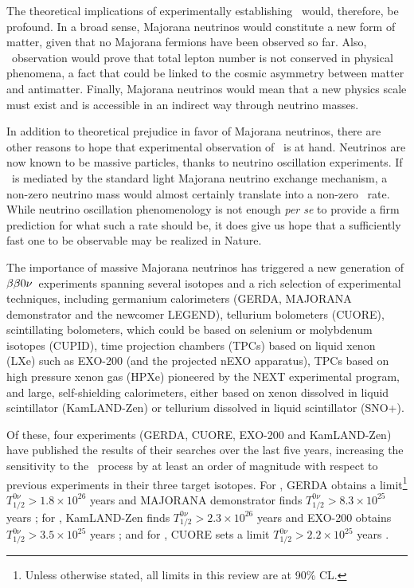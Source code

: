 The theoretical implications of experimentally establishing \bbonu\ would, therefore, be profound. In a broad sense, Majorana neutrinos would constitute a new form of matter, given that no Majorana fermions have been observed so far. Also, \bbonu\ observation would prove that total lepton number is not conserved in physical phenomena, a fact that could be linked to the cosmic asymmetry between matter and antimatter.  Finally, Majorana neutrinos would mean that a new physics scale must exist and is accessible in an indirect way through neutrino masses. 

In addition to theoretical prejudice in favor of Majorana neutrinos, there are other reasons to hope that experimental observation of \bbonu\ is at hand. Neutrinos are now known to be massive particles, thanks to neutrino oscillation experiments. If \bbonu\ is mediated by the standard light Majorana neutrino exchange mechanism, a non-zero neutrino mass would almost certainly translate into a non-zero \bbonu\ rate. While neutrino oscillation phenomenology is not enough \emph{per se} to provide a firm prediction for what such a rate should be, it does give us hope that a sufficiently fast one to be observable may be realized in Nature. 

The importance of massive Majorana neutrinos 
has triggered a new generation of $\beta\beta0\nu$~experiments spanning several isotopes and a rich selection of experimental techniques, including germanium calorimeters (GERDA, MAJORANA demonstrator and the newcomer LEGEND), tellurium bolometers (CUORE), scintillating bolometers, which could be based on selenium or molybdenum isotopes (CUPID), time projection chambers (TPCs) based on liquid xenon (LXe) such as EXO-200 (and the projected nEXO apparatus), TPCs based on high pressure xenon gas (HPXe) pioneered by the NEXT experimental program, and large, self-shielding calorimeters, either based on xenon dissolved in liquid scintillator (KamLAND-Zen) or tellurium dissolved in liquid scintillator (SNO+). 

Of these, four experiments (GERDA, CUORE, EXO-200 and KamLAND-Zen) have published the results of their searches over the last five years, increasing the sensitivity to the \bbonu\ process by at least an order of magnitude with respect to previous experiments in their three target isotopes. 
For , GERDA obtains a limit\footnote{Unless otherwise stated, all limits in this review are at 90\% CL.} \mbox{$T^{0\nu}_{1/2} > 1.8 \times 10^{26}$} years \cite{GERDA:2020xhi} and MAJORANA demonstrator finds \mbox{$T^{0\nu}_{1/2} > 8.3 \times 10^{25}$} years \cite{Majorana:2022udl};  
for , KamLAND-Zen finds \mbox{$T^{0\nu}_{1/2} > 2.3 \times 10^{26}$} years  \cite{KamLAND-Zen:2022tow} and EXO-200 obtains \mbox{$T^{0\nu}_{1/2} > 3.5 \times 10^{25}$} years \cite{EXO-200:2019rkq}; and for 
 , CUORE sets a limit \mbox{$T^{0\nu}_{1/2} > 2.2 \times 10^{25}$} years \cite{CUORE:2021mvw}. 
 
